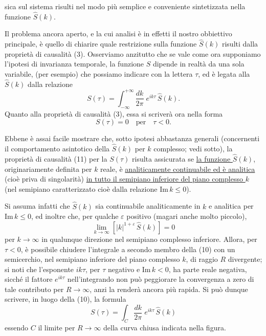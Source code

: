 \documentclass[11pt, a4paper]{book}
\numberwithin{equation}{section}
\begin{document}

sica sul sistema risulti nel modo più semplice e conveniente sintetizzata nella
funzione $\hat{S}(k)$.

Il problema ancora aperto, e la cui analisi è in effetti il nostro
obbiettivo principale, è quello di chiarire quale restrizione sulla funzione
$\hat{S}(k)$ risulti dalla proprietà di causalità (3). Osserviamo anzitutto che
se vale come ora supponiamo l'ipotesi di invarianza temporale, la funzione $S$
dipende in realtà da una sola variabile, (per esempio) che possiamo indicare
con la lettera $\tau$, ed è legata alla $\hat{S}(k)$ dalla relazione
\begin{equation}
    S(\tau) = \int_{-\infty}^{+\infty} \frac{dk}{2\pi}\; e^{ik\tau}\,\hat{S}(k). \tag{10}
\end{equation}
Quanto alla proprietà di causalità (3), essa si scriverà ora nella forma
\begin{equation}
    S(\tau) = 0 \quad \text{per} \quad \tau < 0. \tag{11}
\end{equation}

Ebbene è assai facile mostrare che, sotto ipotesi abbastanza generali
(concernenti il comportamento asintotico della $\hat{S}(k)$ per $k$ complesso;
vedi sotto), la proprietà di causalità (11) per la $S(\tau)$ risulta assicurata
se \underline{la funzione $\hat{S}(k)$}, originariamente definita per $k$ reale, è
\uline{analiticamente continuabile ed è analitica} (cioè priva di singolarità)
\uline{in tutto il semipiano inferiore del piano complesso $k$} (nel semipiano
caratterizzato cioè dalla relazione $\mathrm{Im}\, k \leq 0$).

\medskip
Si assuma infatti che $\hat{S}(k)$ sia continuabile analiticamente in $k$
e analitica per $\mathrm{Im}\, k \leq 0$, ed inoltre che, per qualche $\varepsilon$
positivo (magari anche molto piccolo),
\[
    \lim_{k \to \infty} \left[|k|^{1+\varepsilon}\,\hat{S}(k)\right] = 0
\]
per $k \to \infty$ in qualunque direzione nel semipiano complesso inferiore.
Allora, per $\tau < 0$, è possibile chiudere l'integrale a secondo membro della
(10) con un semicerchio, nel semipiano inferiore del piano complesso $k$, di
raggio $R$ divergente; si noti che l'esponente $ik\tau$, per $\tau$ negativo e
$\mathrm{Im}\, k < 0$, ha parte reale negativa, sicché il fattore $e^{ik\tau}$
nell'integrando non può peggiorare la convergenza a zero di tale contributo per
$R \to \infty$, anzi la renderà ancora più rapida.
Si può dunque scrivere, in luogo della (10), la formula
\[
    S(\tau) = \int_C \frac{dk}{2\pi}\; e^{ik\tau}\,\hat{S}(k)
\]
essendo $C$ il limite per $R \to \infty$ della curva chiusa indicata nella figura.
\end{document}
